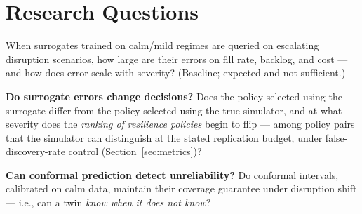 \documentclass[12pt,a4paper]{article}
\begin{document}
\section{Research Questions}

\begin{description}[leftmargin=1.2cm]
\item[RQ1.] When surrogates trained on calm/mild regimes are queried on escalating disruption scenarios, how large are their errors on fill rate, backlog, and cost --- and how does error scale with severity? (Baseline; expected and not sufficient.)
\item[RQ2.] \textbf{Do surrogate errors change decisions?} Does the policy selected using the surrogate differ from the policy selected using the true simulator, and at what severity does the \emph{ranking of resilience policies} begin to flip --- among policy pairs that the simulator can distinguish at the stated replication budget, under false-discovery-rate control (Section~\ref{sec:metrics})?
\item[RQ3.] \textbf{Can conformal prediction detect unreliability?} Do conformal intervals, calibrated on calm data, maintain their coverage guarantee under disruption shift --- i.e., can a twin \emph{know when it does not know}?
\end{description}
\end{document}
